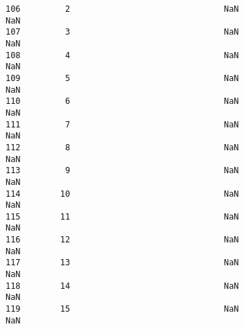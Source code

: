\documentclass[11pt]{article}
\begin{document}
\begin{tcolorbox}[breakable, size=fbox, boxrule=.5pt, pad at break*=1mm, opacityfill=0]
\begin{Verbatim}[commandchars=\\\{\}]
106         2                               NaN                       NaN
107         3                               NaN                       NaN
108         4                               NaN                       NaN
109         5                               NaN                       NaN
110         6                               NaN                       NaN
111         7                               NaN                       NaN
112         8                               NaN                       NaN
113         9                               NaN                       NaN
114        10                               NaN                       NaN
115        11                               NaN                       NaN
116        12                               NaN                       NaN
117        13                               NaN                       NaN
118        14                               NaN                       NaN
119        15                               NaN                       NaN


\end{Verbatim}
\end{tcolorbox}
\end{document}
